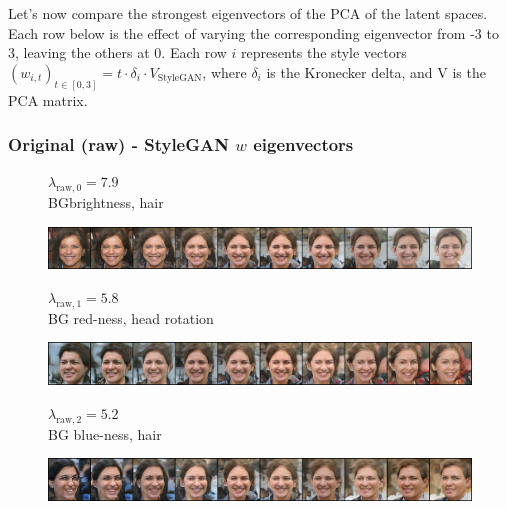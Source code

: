 \documentclass{article}
\begin{document}
Let's now compare the strongest eigenvectors of the PCA of the latent spaces. 
Each row below is the effect of varying the corresponding eigenvector from -3 to 3, leaving the others at 0. Each row $i$ represents the style vectors $(w_{i, t})_{t \in [0, 3]} = t \cdot \delta_i \cdot V_{\text{StyleGAN}}$, where $\delta_i$ is the Kronecker delta, and V is the PCA matrix.


\subsubsection*{Original (raw) - StyleGAN $w$ eigenvectors}


\begin{figure}[H]
  \centering
  \begin{minipage}{.18\linewidth}
      \centering
      $\lambda_{\text{raw}, 0} = 7.9$ \\
      BG\footnotemark brightness, hair
  \end{minipage}%
  \hfill
  \begin{minipage}{.81\linewidth}
      \centering
      \includegraphics[width=\linewidth]{eigen/raw_gan_0.png}
  \end{minipage}
\end{figure}

\begin{figure}[H]
  \centering
  \begin{minipage}{.18\linewidth}
      \centering
      $\lambda_{\text{raw}, 1} = 5.8$ \\
      BG red-ness, head rotation
  \end{minipage}%
  \hfill
  \begin{minipage}{.81\linewidth}
      \centering
      \includegraphics[width=\linewidth]{eigen/raw_gan_1.png}
  \end{minipage}
\end{figure}

\begin{figure}[H]
  \centering
  \begin{minipage}{.18\linewidth}
      \centering
      $\lambda_{\text{raw}, 2} = 5.2$ \\
      BG blue-ness, hair
  \end{minipage}%
  \hfill
  \begin{minipage}{.81\linewidth}
      \centering
      \includegraphics[width=\linewidth]{eigen/raw_gan_2.png}
  \end{minipage}
\end{figure}
  
\end{document}

